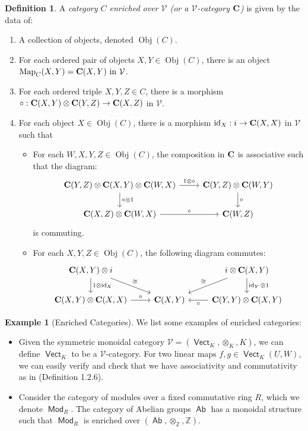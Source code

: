 \documentclass[leqno, openany]{memoir}
\theoremstyle{definition}
\newtheorem{defn}[thm]{Definition}
\newtheorem{exm}[thm]{Example}
\theoremstyle{remark}
\theoremstyle{plain}
\theoremstyle{definition}
\theoremstyle{remark}
\newcommand{\Z}{\mathbb{Z}}
\newcommand{\iso}{\cong}
\DeclareMathOperator{\Ab}{\mathsf{Ab}}
\DeclareMathOperator{\Mod}{\mathsf{Mod}}
\DeclareMathOperator{\Vect}{\mathsf{Vect}}
\DeclareMathOperator{\Obj}{Obj}
\DeclareMathOperator{\id}{id}
\DeclareMathOperator{\Map}{Map}
\begin{document}
\begin{defn}
    A \emph{category $C$ enriched over $\mathcal{V}$ (or a $\mathcal{V}$-category $\bold{C}$)} is given by the data of:
    \begin{enumerate}
        \item A collection of objects, denoted $\Obj(C)$.
        \item For each ordered pair of objects $X,Y \in \Obj(C)$, there is an object $\Map_C(X,Y) = \bold{C}(X,Y)\ \text{in } \mathcal{V}$.
        \item For each ordered triple $X,Y,Z \in C$, there is a morphism $\circ: \bold{C}(X,Y) \otimes \bold{C}(Y,Z) \to \bold{C}(X,Z)$ in $\mathcal{V}$.
        \item For each object $X \in \Obj(C)$, there is a morphism $\id_X: i \to \bold{C}(X,X)$ in $\mathcal{V}$ such that 
        \begin{itemize}
            \item For each $W,X,Y,Z \in \Obj(C)$, the composition in $\bold{C}$ is associative such that the diagram:
            \[\begin{tikzcd}
                \bold{C}(Y,Z) \otimes \bold{C}(X,Y) \otimes \bold{C}(W,X) \ar[r, "1 \otimes \circ"] \ar[d, "\circ \otimes 1"] & \bold{C}(Y,Z) \otimes \bold{C}(W,Y)  \ar[d, "\circ"] \\
                \bold{C}(X,Z) \otimes \bold{C}(W,X) \ar[r, "\circ"] & \bold{C}(W,Z)
            \end{tikzcd}\]
           is commuting.
           \item For each $X,Y,Z \in \Obj(C)$, the following diagram commutes:
           \[\begin{tikzcd}
               \bold{C}(X,Y) \otimes i \ar[d, "1\otimes \id_X"] \ar[dr, "\iso"] &  &  i \otimes \bold{C}(X,Y) \ar[dl, "\iso", swap] \ar[d, "\id_Y\otimes 1"] 
               \\
               \bold{C}(X,Y) \otimes \bold{C}(X,X) \ar[r, "\circ"] & \bold{C}(X,Y) & \ar[l, "\circ"]\bold{C}(Y,Y) \otimes \bold{C}(X,Y)
           \end{tikzcd}\]
        \end{itemize}
    \end{enumerate}
\end{defn}

\begin{exm}[Enriched Categories] We list some examples of enriched categories:
    \begin{itemize}
        \item Given the symmetric monoidal category $\mathcal{V} = (\Vect_K, \otimes_K, K)$, we can define $\Vect_K$ to be a $\mathcal{V}$-category. For two linear maps $f,g\in \Vect_K(U,W)$, we can easily verify and check that we have associativity and commutativity as in (Definition 1.2.6).
        \item Consider the category of modules over a fixed commutative ring $R$, which we denote $\Mod_R$. The category of Abelian groups $\Ab$ has a monoidal structure such that $\Mod_R$ is enriched over $(\Ab, \otimes_{\Z}, \Z)$.
    \end{itemize}
\end{exm}
\end{document}

